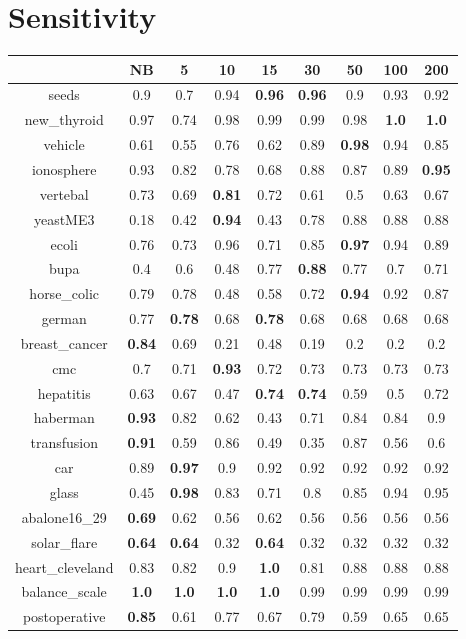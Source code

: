 \documentclass{article}%
\begin{document}
%
\section*{Sensitivity}%
\begin{tabular}{c|cccccccc}%
&NB&5&10&15&30&50&100&200\\%
\hline%
seeds&0.9&0.7&0.94&\textbf{0.96}&\textbf{0.96}&0.9&0.93&0.92\\%
new\_thyroid&0.97&0.74&0.98&0.99&0.99&0.98&\textbf{1.0}&\textbf{1.0}\\%
vehicle&0.61&0.55&0.76&0.62&0.89&\textbf{0.98}&0.94&0.85\\%
ionosphere&0.93&0.82&0.78&0.68&0.88&0.87&0.89&\textbf{0.95}\\%
vertebal&0.73&0.69&\textbf{0.81}&0.72&0.61&0.5&0.63&0.67\\%
yeastME3&0.18&0.42&\textbf{0.94}&0.43&0.78&0.88&0.88&0.88\\%
ecoli&0.76&0.73&0.96&0.71&0.85&\textbf{0.97}&0.94&0.89\\%
bupa&0.4&0.6&0.48&0.77&\textbf{0.88}&0.77&0.7&0.71\\%
horse\_colic&0.79&0.78&0.48&0.58&0.72&\textbf{0.94}&0.92&0.87\\%
german&0.77&\textbf{0.78}&0.68&\textbf{0.78}&0.68&0.68&0.68&0.68\\%
breast\_cancer&\textbf{0.84}&0.69&0.21&0.48&0.19&0.2&0.2&0.2\\%
cmc&0.7&0.71&\textbf{0.93}&0.72&0.73&0.73&0.73&0.73\\%
hepatitis&0.63&0.67&0.47&\textbf{0.74}&\textbf{0.74}&0.59&0.5&0.72\\%
haberman&\textbf{0.93}&0.82&0.62&0.43&0.71&0.84&0.84&0.9\\%
transfusion&\textbf{0.91}&0.59&0.86&0.49&0.35&0.87&0.56&0.6\\%
car&0.89&\textbf{0.97}&0.9&0.92&0.92&0.92&0.92&0.92\\%
glass&0.45&\textbf{0.98}&0.83&0.71&0.8&0.85&0.94&0.95\\%
abalone16\_29&\textbf{0.69}&0.62&0.56&0.62&0.56&0.56&0.56&0.56\\%
solar\_flare&\textbf{0.64}&\textbf{0.64}&0.32&\textbf{0.64}&0.32&0.32&0.32&0.32\\%
heart\_cleveland&0.83&0.82&0.9&\textbf{1.0}&0.81&0.88&0.88&0.88\\%
balance\_scale&\textbf{1.0}&\textbf{1.0}&\textbf{1.0}&\textbf{1.0}&0.99&0.99&0.99&0.99\\%
postoperative&\textbf{0.85}&0.61&0.77&0.67&0.79&0.59&0.65&0.65\\%
\end{tabular}
\end{document}
